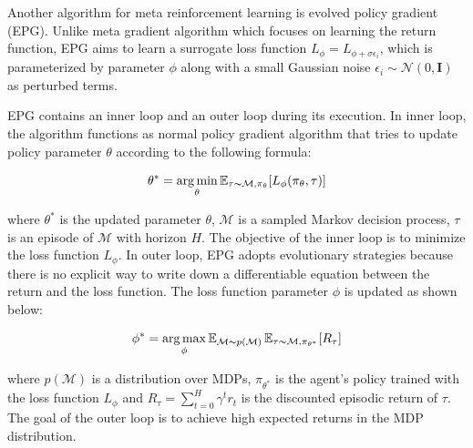Another algorithm for meta reinforcement learning is evolved policy gradient (EPG)\cite{epg}. Unlike meta gradient algorithm which focuses on learning the return function, EPG aims to learn a surrogate loss function $L_\phi = L_{\phi + \sigma\epsilon_i}$, which is parameterized by parameter $\phi$ along with a small Gaussian noise $\epsilon_i \sim \mathcal{N}(0, \mathbf{I})$ as perturbed terms.

\par
EPG contains an inner loop and an outer loop during its execution. In inner loop, the algorithm functions as normal policy gradient algorithm that tries to update policy parameter $\theta$ according to the following formula:

\[\theta^* = \operatorname*{arg\,min}_\theta\operatorname{\mathbb{E}}_{\tau\thicksim\mathcal{M},\pi_\theta}[L_\phi(\pi_\theta,\tau)]\]

where $\theta^*$ is the updated parameter $\theta$, $\mathcal{M}$ is a sampled Markov decision process, $\tau$ is an episode of $\mathcal{M}$ with horizon $\textit{H}$. The objective of the inner loop is to minimize the loss function $L_\phi$. In outer loop, EPG adopts evolutionary strategies because there is no explicit way to write down a differentiable equation between the return and the loss function. The loss function parameter $\phi$ is updated as shown below:

\[\phi^* = \operatorname*{arg\,max}_\phi\operatorname{\mathbb{E}}_{\mathcal{M}\thicksim p(\mathcal{M})}\operatorname{\mathbb{E}}_{\tau\thicksim\mathcal{M},\pi_{\theta^*}}[R_\tau]\]

where $p(\mathcal{M})$ is a distribution over MDPs, $\pi_{\theta^*}$ is the agent's policy trained with the loss function $L_\phi$ and $R_\tau = \sum_{t=0}^{H}\gamma^t{r_t}$ is the discounted episodic return of $\tau$. The goal of the outer loop is to achieve high expected returns in the MDP distribution.

